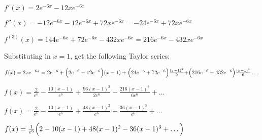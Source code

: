 \documentclass[../main.tex]{subfiles}
\begin{document}
\begin{enumerate}[itemsep=0.7cm]
    $f'(x) = 2e^{-6x} - 12xe^{-6x}$

    $f''(x) = -12e^{-6x} - 12e^{-6x} + 72xe^{-6x} = -24e^{-6x} + 72xe^{-6x}$

    $f^{(3)}(x) = 144e^{-6x} + 72e^{-6x} - 432xe^{-6x} = 216e^{-6x} - 432xe^{-6x}$

    Substituting in $x=1$, get the following Taylor series:

    $f(x) = 2x e^{-6x} = 2e^{-6} + \Bigl(2e^{-6} - 12e^{-6}\Bigr)(x-1) + \Bigl(24e^{-6} + 72e^{-6}\Bigr)\frac{(x-1)^2}{2} + \Bigr(216e^{-6}-432e^{-6}\Bigr)\frac{(x-1)^3}{6}\dots$

    $f(x) = \frac{2}{e^6} - \frac{10(x-1)}{e^6} + \frac{96(x-1)^2}{2e^6} - \frac{216(x-1)^3}{6e^6} + \dots$

    $f(x) = \frac{2}{e^6} - \frac{10(x-1)}{e^6} + \frac{48(x-1)^2}{e^6} - \frac{36(x-1)^3}{e^6} + \dots$

    $f(x) = \frac{1}{e^6}\Bigl(2 - 10(x-1) + 48(x-1)^2 - 36(x-1)^3 + \dots\Bigr)$


\end{enumerate}
\end{document}
